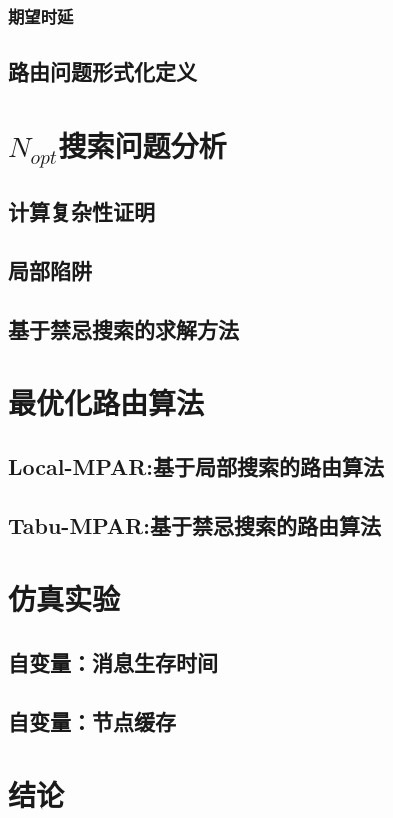 \subsubsection{期望时延}

\subsection{路由问题形式化定义}
\label{chap3:路由问题形式化定义}

\section{$N_{opt}$搜索问题分析}
\label{chap3:搜索问题分析}

\subsection{计算复杂性证明}

\subsection{局部陷阱}

\subsection{基于禁忌搜索的求解方法}

\section{最优化路由算法}
\label{chap3:最优化路由算法}

\subsection{Local-MPAR:基于局部搜索的路由算法}

\subsection{Tabu-MPAR:基于禁忌搜索的路由算法}

\section{仿真实验}
\label{chap3:仿真实验}

\subsection{自变量：消息生存时间}

\subsection{自变量：节点缓存}

\section{结论}
\label{chap3:结论}






